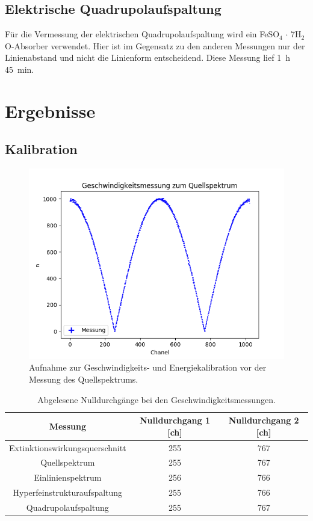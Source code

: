 \documentclass[12pt,a4paper]{article}
\begin{document}
\subsection{Elektrische Quadrupolaufspaltung}
Für die Vermessung der elektrischen Quadrupolaufspaltung wird ein FeSO$_4$ $\cdot$ 7H$_2$O-Absorber verwendet. Hier ist im Gegensatz zu den anderen Messungen nur der Linienabstand und nicht die Linienform entscheidend. Diese Messung lief \SI{1}{h} \SI{45}{min}.

\section{Ergebnisse}
\subsection{Kalibration}

\begin{figure}
\centering
\includegraphics[scale=0.8]{Bilder/Kalibration/Quellspektrum_rohdaten.png}
\caption{Aufnahme zur Geschwindigkeits- und Energiekalibration vor der Messung des Quellspektrums.}
\label{fig:KalibrationRohdaten_Beispiel}
\end{figure}

\begin{table}
\centering
\begin{tabular}{|c|c|c|}
\hline 
Messung & Nulldurchgang 1 [ch] & Nulldurchgang 2 [ch] \\ 
\hline 
Extinktionswirkungsquerschnitt & 255 & 767 \\
\hline 
Quellspektrum & 255 & 767 \\
\hline 
Einlinienspektrum & 256 & 766 \\
\hline 
Hyperfeinstrukturaufspaltung & 255 & 766 \\
\hline 
Quadrupolaufspaltung & 255 & 767 \\
\hline 
\end{tabular} 
\caption{Abgelesene Nulldurchgänge bei den Geschwindigkeitsmessungen.}
\label{tab:Kalibration_Nulldurchgänge}
\end{table}
\end{document}
